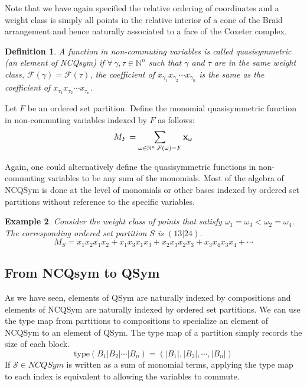 \documentclass[12pt]{amsart}
\newtheorem{definition}{Definition}
\newtheorem{example}[definition]{Example}
\begin{document}
Note that
we have again specified the relative ordering of coordinates and a
weight class is simply all points in the relative interior of a cone
of the Braid arrangement and hence naturally associated to a face of
the Coxeter complex.


\begin{definition}
A function in non-commuting variables is called quasisymmetric (an element of NCQsym) if
$\forall \, \gamma, \tau \in \mathbb{N}^n$ such that $\gamma$ and $\tau$
are in the same weight class, $\mathcal{F}(\gamma) =
\mathcal{F}(\tau)$, the coefficient of $x_{\gamma_1}x_{\gamma_2} \cdots
x_{\gamma_n}$ is the same as the coefficient of $x_{\tau_1}x_{\tau_2} \cdots x_{\tau_n}$.
\end{definition}

Let $F$ be an ordered set partition.  Define the monomial quasisymmetric function in non-commuting variables indexed by $F$ as follows:
$$M_F = \sum_{\omega \in \mathbb{N}^n \, \mathcal{F}(\omega) = F} {\bf{x}}_{\omega}$$

Again, one could alternatively define the quasisymmetric functions in
non-commuting variables to be any sum of the monomials.  Most of the
algebra of NCQSym is done at the level of monomials or other bases
indexed by ordered set partitions without reference to the specific
variables.  


\begin{example}

Consider the weight class of  points that satisfy $\omega_1 = \omega_3 < \omega_2 = \omega_4$.  The corresponding ordered set partition $S$ is $(13|24)$.  
$$M_S = x_1x_2x_1x_2 + x_1x_3x_1x_3 + x_2x_3x_2x_3 + x_3x_4x_3x_4 + \cdots$$  

\end{example}

\subsection{From NCQsym to QSym}

As we have seen, elements of QSym are naturally indexed by
compositions and elements of NCQSym are naturally indexed by ordered
set partitions.  We can use the type map from partitions to
compositions to specialize an element of NCQSym to an element of QSym.
The type map of a partition simply records the size of each block.
$$\textrm{type}(B_1|B_2|\cdots|B_n) = (|B_1|, |B_2|, \cdots, |B_n|)$$
If $\mathcal{S} \in NCQSym$ is written as a sum of monomial terms,
applying the type map to each index is equivalent to allowing the
variables to commute.
\end{document}
